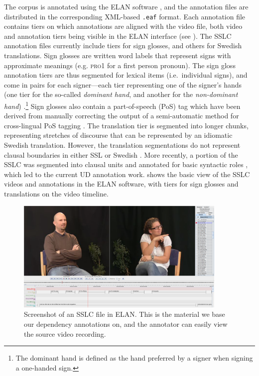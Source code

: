 \documentclass[11pt]{article}
\begin{document}
The corpus is annotated using the ELAN software \cite{Wittenburg2006elan}, and
the annotation files are distributed in the corresponding XML-based
\texttt{.eaf} format. Each annotation file contains tiers on which annotations
are aligned with the video file, both video and annotation tiers being visible
in the ELAN interface (see ). The SSLC annotation files
currently include tiers for sign glosses, and others for Swedish translations.
Sign glosses are written word labels that represent signs with approximate
meanings (e.g. \textsc{pro1} for a first person pronoun). The sign gloss
annotation tiers are thus segmented for lexical items (i.e.~individual signs),
and come in pairs for each signer---each tier representing one of the signer's
hands (one tier for the so-called \textit{dominant hand}, and another for the
\textit{non-dominant hand}) \cite{Mesch2015gloss}.\footnote{The dominant hand
is defined as the hand preferred by a signer when signing a one-handed sign.}
Sign glosses also contain a part-of-speech (PoS) tag which have been derived
from manually correcting the output of a semi-automatic method for
cross-lingual PoS tagging \cite{Ostling2015enriching}. The translation tier is
segmented into longer chunks, representing stretches of discourse that can be
represented by an idiomatic Swedish translation. However, the translation
segmentations do not represent clausal boundaries in either SSL or Swedish
\cite{Borstell2014segmenting}. More recently, a portion of the SSLC was
segmented into clausal units and annotated for basic syntactic roles
\cite{Borstell2016syntactic}, which led to the current UD annotation work.
 shows the basic view of the SSLC videos and annotations
in the ELAN software, with tiers for sign glosses and translations on the
video timeline.

\begin{figure}[p]
	\centering
	\includegraphics[width=0.9\textwidth]{sslc_elan.png}
	\caption{Screenshot of an SSLC file in ELAN. This is the material we base
    our dependency annotations on, and the annotator can easily view the
    source video recording.}
	\label{fig:sslc_elan}
\end{figure}
\end{document}
